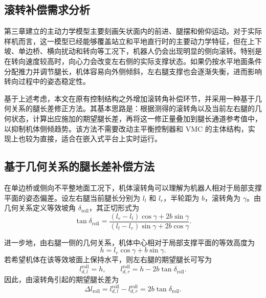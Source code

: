 \subsection{滚转补偿需求分析}

第三章建立的主动力学模型主要刻画矢状面内的前进、腿摆和俯仰运动。对于实际样机而言，这一模型已经能够覆盖站立和平地直行时的主要动力学特征，但在上下坡、单边桥、横向扰动和转向等工况下，机器人仍会出现明显的侧向滚转。特别是在转向速度较高时，向心力会改变左右侧的实际支撑状态。如果仍按水平地面条件分配推力并调节腿长，机体容易向外侧倾斜，左右腿支撑也会逐渐失衡，进而影响转向过程中的姿态稳定性。

基于上述考虑，本文在原有控制结构之外增加滚转角补偿环节，并采用一种基于几何关系的腿长差修正方法。其基本思路是：根据测得的滚转角以及当前左右腿的几何状态，计算出应施加的期望腿长差，再将这一修正量叠加到腿长通道参考值中，以抑制机体侧倾趋势。该方法不需要改动主平衡控制器和 VMC 的主体结构，实现上也较为直接，适合在嵌入式平台上实时运行。

\subsection{基于几何关系的腿长差补偿方法}

在单边桥或侧向不平整地面工况下，机体滚转角可以理解为机器人相对于局部支撑平面的姿态偏差。设左右腿当前腿长分别为 $l_l$ 和 $l_r$，半轮距为 $b$，滚转角为 $\gamma$。由几何关系定义等效坡角 $\delta_{\mathrm{roll}}$，其正切形式为
\begin{equation}
  \tan \delta_{\mathrm{roll}}
  =
  \frac{
    (l_r-l_l)\cos\gamma + 2b\sin\gamma
  }{
    (l_l-l_r)\sin\gamma + 2b\cos\gamma
  }.
  \label{eq:roll-delta}
\end{equation}

进一步地，由右腿一侧的几何关系，机体中心相对于局部支撑平面的等效高度为
\begin{equation}
  h
  =
  l_r\cos\gamma + b\sin\gamma.
  \label{eq:roll-body-height}
\end{equation}
若希望机体在该等效坡面上保持水平，则左右腿的期望腿长可写为
\begin{equation}
  l_{d,l}^{\mathrm{roll}} = h,
  \qquad
  l_{d,r}^{\mathrm{roll}} = h - 2b\tan \delta_{\mathrm{roll}}.
  \label{eq:roll-leg-target}
\end{equation}
因此，由滚转角引起的期望腿长差为
\begin{equation}
  \Delta l_{\mathrm{roll}}
  =
  l_{d,l}^{\mathrm{roll}} - l_{d,r}^{\mathrm{roll}}
  =
  2b\tan \delta_{\mathrm{roll}}.
  \label{eq:roll-leg-diff}
\end{equation}


